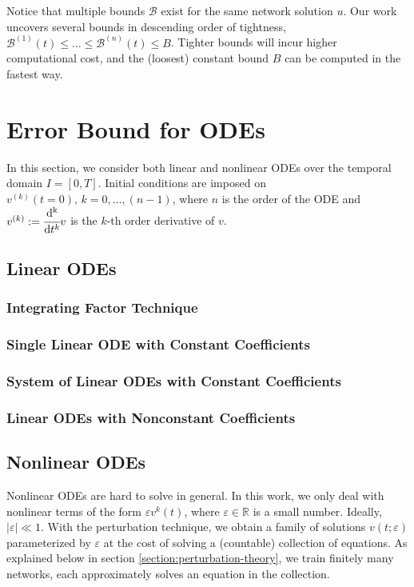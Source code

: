 \documentclass{article}
\newcommand{\Bound}{\mathcal{B}}
\begin{document}
    Notice that multiple bounds $\Bound$ exist for the same network solution $u$.
    Our work uncovers several bounds in descending order of tightness, $\Bound^{(1)}(t) \leq \dots \leq \Bound^{(n)}(t) \leq B$. Tighter bounds will incur higher computational cost, and the (loosest) constant bound $B$ can be computed in the fastest way.


\section{Error Bound for ODEs}
In this section, we consider both linear and nonlinear ODEs over the temporal domain $I=[0, T]$. 
Initial conditions are imposed on $v^{(k)}(t=0),\, k = 0, \dots, (n - 1)$, where $n$ is the order of the ODE and $v^{(k)} := \cfrac{\mathrm{d^k}}{\mathrm{d}t^k}v$ is the $k$-th order derivative of $v$.

\subsection{Linear ODEs}
\subsubsection{Integrating Factor Technique}
\subsubsection{Single Linear ODE with Constant Coefficients}\label{section:single-linear-ode-with-constant-coefficients}
\subsubsection{System of Linear ODEs with Constant Coefficients}
\subsubsection{Linear ODEs with Nonconstant Coefficients}

\subsection{Nonlinear ODEs}
    Nonlinear ODEs are hard to solve in general. 
    In this work, we only deal with nonlinear terms of the form $\varepsilon v^k(t)$, where $\varepsilon \in \mathbb{R}$ is a small number. 
    Ideally, $|\varepsilon| \ll 1$. 
    With the perturbation technique, we obtain a family of solutions $v(t;\varepsilon)$ parameterized by $\varepsilon$ at the cost of solving a (countable) collection of equations. 
    As explained below in section \ref{section:perturbation-theory}, we train finitely many networks, each approximately solves an equation in the collection.
\end{document}
